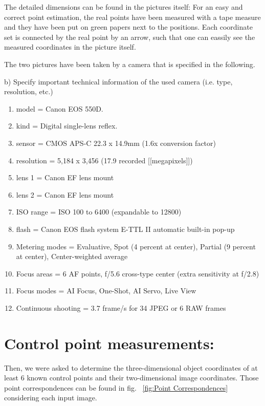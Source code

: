 \documentclass[a4paper,headings=small]{scrartcl}
\numberwithin{equation}{section} %
\numberwithin{figure}{section}   %
\begin{document}
The detailed dimensions can be found in the pictures itself:
For an easy and correct point estimation, the real points have been measured with a tape measure
and they have been put on green papers next to the positions.
Each coordinate set is connected by the real point by an arrow,
such that one can eassily see the measured coordinates in the picture itself.

The two pictures have been taken by a camera that is specified in the following.

b) Specify important technical information of the used camera
(i.e. type, resolution, etc.)

\begin{enumerate}
       \item model               = Canon EOS 550D.
       \item kind                = Digital single-lens reflex.
       \item sensor              = CMOS APS-C 22.3 x 14.9mm (1.6x conversion factor)
       \item resolution          = 5,184 x 3,456 (17.9 recorded [[megapixels]])
       \item lens 1              = Canon EF lens mount
       \item lens 2              = Canon EF lens mount
       \item ISO range           = ISO 100 to 6400 (expandable to 12800)
       \item flash               = Canon EOS flash system E-TTL II automatic built-in pop-up
       \item Metering modes      = Evaluative, Spot (4 percent at center), Partial (9 percent at center), Center-weighted average
       \item Focus areas         = 6 AF points, f/5.6 cross-type center (extra sensitivity at f/2.8)
       \item Focus modes 	 = AI Focus, One-Shot, AI Servo, Live View
       \item Continuous shooting = 3.7 frame/s for 34 JPEG or 6 RAW frames
\end{enumerate}

\section{Control point measurements:}

Then, we were asked to determine the three-dimensional object coordinates of at least 6 known
control points and their two-dimensional image coordinates. 
Those point correspondences can be found in fig. ~\ref{fig:Point Correspondences}
considering each input image.
\end{document}
